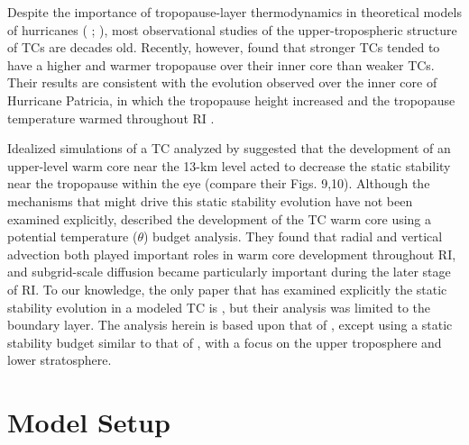 \documentclass{ametsoc}
\begin{document}
Despite the importance of tropopause-layer thermodynamics in theoretical models of hurricanes (\citeauthor{EmanuelRotunno2011} \citeyear{EmanuelRotunno2011}; \citeauthor{Emanuel2012} \citeyear{Emanuel2012}), most observational studies of the upper-tropospheric structure of TCs are decades old.
Recently, however, \cite{KomaromiDoyle2017} found that stronger TCs tended to have a higher and warmer tropopause over their inner core than weaker TCs.
Their results are consistent with the evolution observed over the inner core of Hurricane Patricia, in which the tropopause height increased and the tropopause temperature warmed throughout RI \citep{DuranMolinari2018}.

Idealized simulations of a TC analyzed by \cite{OhnoSatoh2015} suggested that the development of an upper-level warm core near the 13-km level acted to decrease the static stability near the tropopause within the eye (compare their Figs. 9,10).
Although the mechanisms that might drive this static stability evolution have not been examined explicitly, \cite{SternZhang2013} described the development of the TC warm core using a potential temperature ($\theta$) budget analysis.
They found that radial and vertical advection both played important roles in warm core development throughout RI, and subgrid-scale diffusion became particularly important during the later stage of RI.
To our knowledge, the only paper that has examined explicitly the static stability evolution in a modeled TC is \cite{Kepertetal2016}, but their analysis was limited to the boundary layer.
The analysis herein is based upon that of \cite{SternZhang2013}, except using a static stability budget similar to that of \cite{Kepertetal2016}, with a focus on the upper troposphere and lower stratosphere.

 \section{Model Setup}
\end{document}
